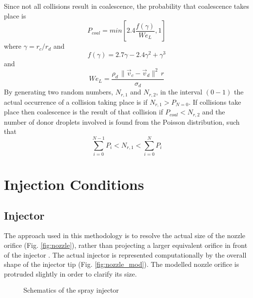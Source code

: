\documentclass[a4paper,10pt]{article}
\begin{document}
Since not all collisions result in coalescence, the probability that coalescence takes place is
\begin{equation}
P_{coal} = min \left[ 2.4 \frac{f(\gamma)}{We_L}, 1 \right]
\end{equation}
where $\gamma=r_c/r_d$ and
\begin{equation}
f(\gamma) = 2.7\gamma -2.4\gamma^2 +\gamma^3
\end{equation}
and
\begin{equation}
We_L = \frac{\rho_d \, \parallel \vec{v}_c-\vec{v}_d \parallel^2 \, r}{\sigma_d}
\end{equation}
By generating two random numbers, $N_{r,1}$ and $N_{r,2}$, in the interval $(0-1)$ the actual occurrence of a collision taking place is if $N_{r,1}>P_{N=0}$.  If collisions take place then coalescence is the result of that collision if $P_{coal}<N_{r,2}$ and the number of donor droplets involved is found from the Poisson distribution, such that
\begin{equation}
\sum_{i=0}^{N-1} P_i < N_{r,1} < \sum_{i=0}^{N} P_i
\end{equation}


\section{Injection Conditions}  \label{sec:inj_cond}
\subsection{Injector}
The approach used in this methodology is to resolve the actual size of the nozzle orifice (Fig. \ref{fig:nozzle}), rather than projecting a larger equivalent orifice in front of the injector \cite{beck2000}. The actual injector is represented computationally by the overall shape of the injector tip (Fig. \ref{fig:nozzle_mod}). The modelled nozzle orifice is protruded slightly in order to clarify its size.
\begin{figure}[H]
\centering
{}
\caption{Schematics of the spray injector}
\end{figure}
\end{document}
